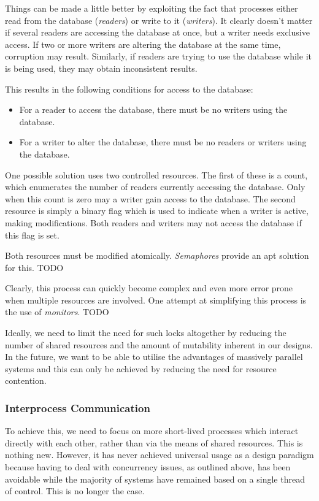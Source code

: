 Things can be made a little better by exploiting the fact that
processes either read from the database (\emph{readers}) or write to
it (\emph{writers}).  It clearly doesn't matter if several readers are
accessing the database at once, but a writer needs exclusive access.
If two or more writers are altering the database at the same time,
corruption may result.  Similarly, if readers are trying to use the
database while it is being used, they may obtain inconsistent results.

This results in the following conditions for access to the database:
\begin{itemize}
\item For a reader to access the database, there must be no writers
  using the database.
\item For a writer to alter the database, there must be no readers or
  writers using the database.
\end{itemize}
One possible solution uses two controlled resources.  The first of
these is a count, which enumerates the number of readers currently
accessing the database.  Only when this count is zero may a writer
gain access to the database.  The second resource is simply a binary
flag which is used to indicate when a writer is active, making
modifications.  Both readers and writers may not access the database
if this flag is set.

Both resources must be modified atomically.  \emph{Semaphores} provide
an apt solution for this. TODO

Clearly, this process can quickly become complex and even more error
prone when multiple resources are involved.  One attempt at
simplifying this process is the use of \emph{monitors}.  TODO

Ideally, we need to limit the need for such locks altogether by
reducing the number of shared resources and the amount of mutability
inherent in our designs.  In the future, we want to be able to utilise
the advantages of massively parallel systems and this can only be
achieved by reducing the need for resource contention.

\subsubsection{Interprocess Communication}

To achieve this, we need to focus on more short-lived processes which
interact directly with each other, rather than via the means of shared
resources.  This is nothing new.  However, it has never achieved
universal usage as a design paradigm because having to deal with
concurrency issues, as outlined above, has been avoidable while the
majority of systems have remained based on a single thread of control.
This is no longer the case.

